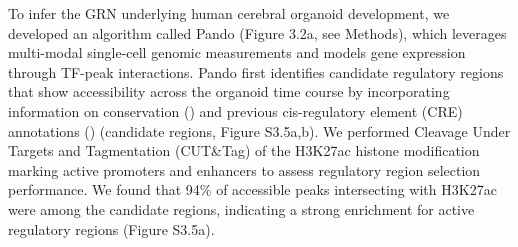 To infer the GRN underlying human cerebral organoid development, we developed an algorithm called Pando (Figure 3.2a, see Methods), which leverages multi-modal single-cell genomic measurements and models gene expression through TF-peak interactions. Pando first identifies candidate regulatory regions that show accessibility across the organoid time course by incorporating information on conservation (\cite{siepel_evolutionarily_2005}) and previous cis-regulatory element (CRE) annotations (\cite{encode_project_consortium_expanded_2020}) (candidate regions, Figure S3.5a,b). We performed Cleavage Under Targets and Tagmentation (CUT\&Tag) of the H3K27ac histone modification marking active promoters and enhancers to assess regulatory region selection performance. We found that 94\% of accessible peaks intersecting with H3K27ac were among the candidate regions, indicating a strong enrichment for active regulatory regions (Figure S3.5a). 
